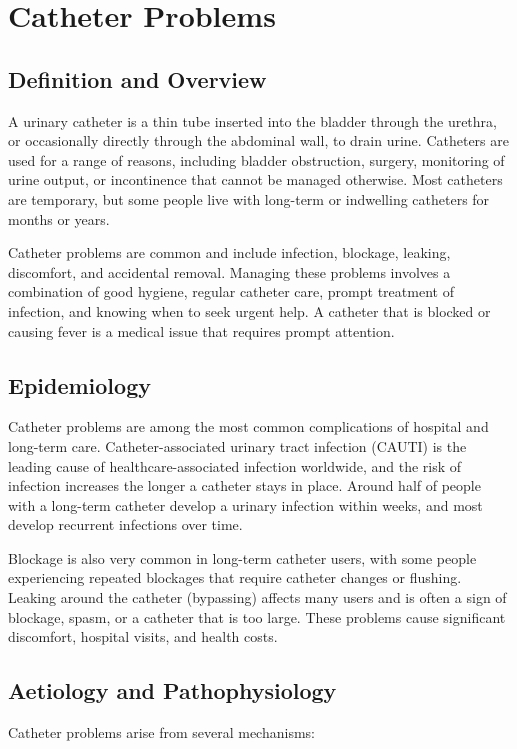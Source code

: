 \chapter{Catheter Problems}

\section*{Definition and Overview}
A urinary catheter is a thin tube inserted into the bladder through the urethra, or occasionally directly through the abdominal wall, to drain urine. Catheters are used for a range of reasons, including bladder obstruction, surgery, monitoring of urine output, or incontinence that cannot be managed otherwise. Most catheters are temporary, but some people live with long-term or indwelling catheters for months or years.

Catheter problems are common and include infection, blockage, leaking, discomfort, and accidental removal. Managing these problems involves a combination of good hygiene, regular catheter care, prompt treatment of infection, and knowing when to seek urgent help. A catheter that is blocked or causing fever is a medical issue that requires prompt attention.

\section*{Epidemiology}
Catheter problems are among the most common complications of hospital and long-term care. Catheter-associated urinary tract infection (CAUTI) is the leading cause of healthcare-associated infection worldwide, and the risk of infection increases the longer a catheter stays in place. Around half of people with a long-term catheter develop a urinary infection within weeks, and most develop recurrent infections over time.

Blockage is also very common in long-term catheter users, with some people experiencing repeated blockages that require catheter changes or flushing. Leaking around the catheter (bypassing) affects many users and is often a sign of blockage, spasm, or a catheter that is too large. These problems cause significant discomfort, hospital visits, and health costs.

\section*{Aetiology and Pathophysiology}
Catheter problems arise from several mechanisms:

